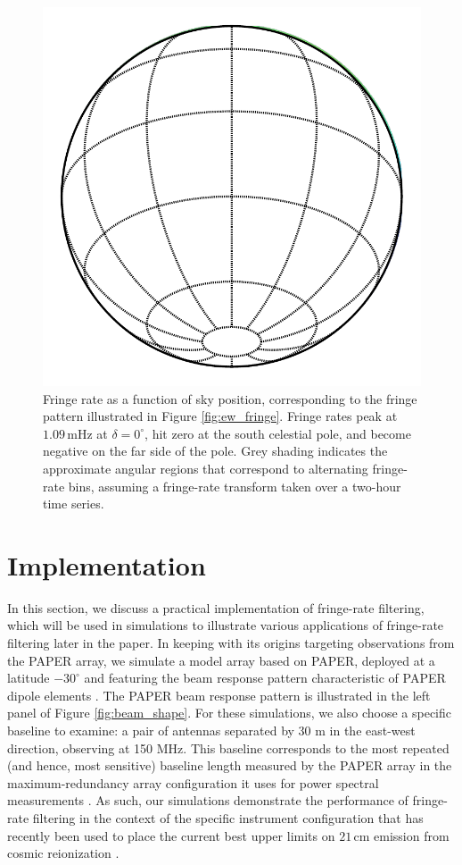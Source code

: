 \documentclass[twocolumn,apj,numberedappendix]{emulateapj}
\begin{document}
\begin{figure}
\includegraphics[width=.9\columnwidth]{plots/fringe_contours}
\caption{
Fringe rate as a function of sky position, corresponding to the fringe pattern illustrated in
Figure \ref{fig:ew_fringe}.  Fringe rates peak at $1.09\,\textrm{mHz}$ at $\delta=0^\circ$, hit zero at
the south celestial pole, and become negative on the far side of the pole.  Grey shading indicates
the approximate angular regions that correspond to alternating fringe-rate bins, assuming a
fringe-rate transform taken over a two-hour time series.
}\label{fig:fringe_contours}
\end{figure}



\section{Implementation}
\label{sec:Implementation}

In this section, we discuss a practical implementation of fringe-rate filtering, which will be used in simulations to illustrate various applications of fringe-rate filtering later in the paper. In keeping with its origins targeting observations from the
PAPER array, we simulate a model array based on PAPER, deployed at a latitude $-30^\circ$
and featuring the beam response pattern characteristic of PAPER dipole elements \citep{parsons_et_al2008,pober_et_al2012}.
The PAPER beam response pattern is illustrated in the left panel of Figure \ref{fig:beam_shape}.
For these simulations, we also choose a specific baseline to examine: a pair of antennas separated by 30 m in the 
east-west direction, observing at 150 MHz.  This baseline corresponds to the most repeated (and hence,
most sensitive) baseline length measured by the PAPER array in the maximum-redundancy array configuration it uses
for power spectral measurements \citep{parsons_et_al2012a,P14,ali_et_al2015}.  As such, our simulations demonstrate the performance of fringe-rate filtering in the context of the specific instrument configuration
that has recently been used to place the current best upper limits on $21\,\textrm{cm}$ emission from cosmic reionization \citep{P14,J14}.
\end{document}
